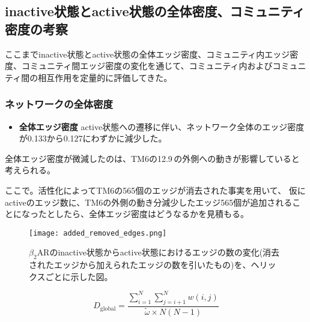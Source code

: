 \subsection{inactive状態とactive状態の全体密度、コミュニティ密度の考察}

ここまでinactive状態とactive状態の全体エッジ密度、コミュニティ内エッジ密度、コミュニティ間エッジ密度の変化を通じて、コミュニティ内およびコミュニティ間の相互作用を定量的に評価してきた。

\subsubsection{ネットワークの全体密度}

\begin{itemize}
  \item \textbf{全体エッジ密度}  
  active状態への遷移に伴い、ネットワーク全体のエッジ密度が0.133から0.127にわずかに減少した。
\end{itemize}

全体エッジ密度が微減したのは、TM6の12.9\,\text{\AA}の外側への動きが影響していると考えられる。


ここで。活性化によってTM6の565個のエッジが消去された事実を用いて、
仮にactiveのエッジ数に、TM6の外側の動き分減少したエッジ565個が追加されることになったとしたら、全体エッジ密度はどうなるかを見積もる。

\begin{figure}[htbp]
  \centering
  \texttt{[image: added\_removed\_edges.png]}
  \caption{$\beta_2$ARのinactive状態からactive状態におけるエッジの数の変化(消去されたエッジから加えられたエッジの数を引いたもの)を、ヘリックスごとに示した図。}
  \label{fig:inter}
\end{figure}

\newpage

\begin{equation}
  D_{\text{global}} = \frac{\sum_{i=1}^{N} \sum_{j=i+1}^{N} w(i, j)}{\tilde{\omega} \times N(N-1)}
\end{equation}

